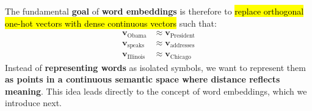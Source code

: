 \highspace
The fundamental \textbf{goal} of \textbf{word embeddings} is therefore to \hl{replace orthogonal one-hot vectors with dense continuous vectors} such that:
\begin{align*}
    \mathbf{v}_{\text{Obama}} &\approx \mathbf{v}_{\text{President}} \\
    \mathbf{v}_{\text{speaks}} &\approx \mathbf{v}_{\text{addresses}} \\
    \mathbf{v}_{\text{Illinois}} &\approx \mathbf{v}_{\text{Chicago}}
\end{align*}
Instead of \textbf{representing words} as isolated symbols, we want to represent them \textbf{as points in a continuous semantic space where distance reflects meaning}. This idea leads directly to the concept of word embeddings, which we introduce next.